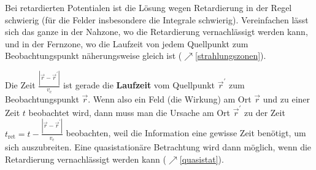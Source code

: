 		   Bei retardierten Potentialen ist die Lösung wegen Retardierung in der Regel schwierig (für die Felder insbesondere die Integrale schwierig). Vereinfachen lässt sich das ganze in der Nahzone, wo die Retardierung vernachlässigt werden kann, und in der Fernzone, wo die Laufzeit von jedem Quellpunkt zum Beobachtungspunkt näherungsweise gleich ist ($\nearrow$\ref{strahlungszonen}).
		        \begin{center}
			        
		        \end{center}
		   Die Zeit \(\frac{|\vec{r} -\vec{r}^\prime |}{ v_\mathrm{c}}\) ist gerade die \textbf{Laufzeit} vom Quellpunkt $\vec{r}^\prime$ zum Beobachtungspunkt $\vec{r}$. Wenn also ein Feld (die Wirkung) am Ort $\vec{r}$ und zu einer Zeit $t$ beobachtet wird, dann muss man die Ursache am Ort $\vec{r}^\prime$ zu der Zeit $t_\mathrm{ret} = t - \frac{|\vec{r} -\vec{r}^\prime |}{ v_\mathrm{c}}$ beobachten, weil die Information eine gewisse Zeit benötigt, um sich auszubreiten. Eine quasistationäre Betrachtung wird dann möglich, wenn die Retardierung vernachlässigt werden kann ($\nearrow$\ref{quasistat}).

